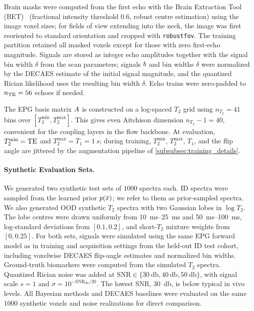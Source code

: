 Brain masks were computed from the first echo with the Brain Extraction Tool (\gls*{BET})~\citep{smith_fast_2002} (fractional intensity threshold $0.6$, robust centre estimation) using the image voxel sizes;
for fields of view extending into the neck, the image was first reoriented to standard orientation and cropped with \texttt{robustfov}.
The training partition retained all masked voxels except for those with zero first-echo magnitude.
Signals are stored as integer echo amplitudes together with the signal bin width $\delta$ from the scan parameters;
signals $b$ and bin widths $\delta$ were normalized by the \gls*{DECAES} estimate of the initial signal magnitude, and the quantized Rician likelihood uses the resulting bin width $\delta$.
Echo trains were zero-padded to $n_{\mathrm{TE}} = 56$ echoes if needed.

The \gls*{EPG} basis matrix $A$ is constructed on a log-spaced $T_2$ grid using $n_{T_2} = 41$ bins over $[T_2^{\min}, T_2^{\max}]$.
This gives even Aitchison dimension $n_{T_2} - 1 = 40$, convenient for the coupling layers in the flow backbone.
At evaluation, $T_2^{\min} = \mathrm{TE}$ and $T_2^{\max} = T_1 = \SI{1}{s}$;
during training, $T_2^{\min}$, $T_2^{\max}$, $T_1$, and the flip angle are jittered by the augmentation pipeline of \cref{subsubsec:training_details}.

\paragraph*{Synthetic Evaluation Sets.}
We generated two synthetic test sets of $\num{1000}$ spectra each.
ID spectra were sampled from the learned prior $p(\bar{x})$;
we refer to them as prior-sampled spectra.
We also generated OOD synthetic $T_2$ spectra with two Gaussian lobes in $\log T_2$.
The lobe centres were drawn uniformly from \SIrange{10}{25}{\ms} and \SIrange{50}{100}{\ms}, log-standard deviations from $[0.1,0.2]$, and short-$T_2$ mixture weights from $[0,0.25]$.
For both sets, signals were simulated using the same \gls*{EPG} forward model as in training and acquisition settings from the held-out ID test cohort, including voxelwise \gls*{DECAES} flip-angle estimates and normalized bin widths.
Ground-truth biomarkers were computed from the simulated $T_2$ spectra.
Quantized Rician noise was added at $\mathrm{SNR} \in \{\SI{30}{\decibel}, \SI{40}{\decibel}, \SI{50}{\decibel}\}$, with signal scale $s=1$ and $\sigma=10^{-\mathrm{SNR}_{\si{\decibel}}/20}$.
The lowest \gls*{SNR}, \SI{30}{\decibel}, is below typical in vivo levels.
All Bayesian methods and \gls*{DECAES} baselines were evaluated on the same $\num{1000}$ synthetic voxels and noise realizations for direct comparison.

